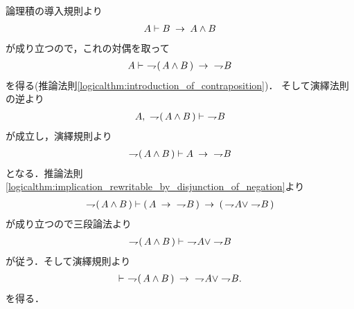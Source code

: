	\begin{prf}
		論理積の導入規則より
		\begin{align}
			A \vdash B \rarrow A \wedge B
		\end{align}
		が成り立つので，これの対偶を取って
		\begin{align}
			A \vdash\ \negation (\, A \wedge B\, ) \rarrow\ \negation B
		\end{align}
		を得る(推論法則\ref{logicalthm:introduction_of_contraposition})．
		そして演繹法則の逆より
		\begin{align}
			A,\ \negation (\, A \wedge B\, ) \vdash\ \negation B
		\end{align}
		が成立し，演繹規則より
		\begin{align}
			\negation (\, A \wedge B\, ) \vdash A \rarrow\ \negation B
		\end{align}
		となる．推論法則\ref{logicalthm:implication_rewritable_by_disjunction_of_negation}より
		\begin{align}
			\negation (\, A \wedge B\, ) \vdash (\, A \rarrow\ \negation B\, )
			\rarrow (\, \negation A \vee \negation B\, )
		\end{align}
		が成り立つので三段論法より
		\begin{align}
			\negation (\, A \wedge B\, ) \vdash\ \negation A \vee \negation B
		\end{align}
		が従う．そして演繹規則より
		\begin{align}
			\vdash\ \negation (\, A \wedge B\, )
			\rarrow\ \negation A \vee \negation B.
		\end{align}
		を得る．
		\QED
	\end{prf}